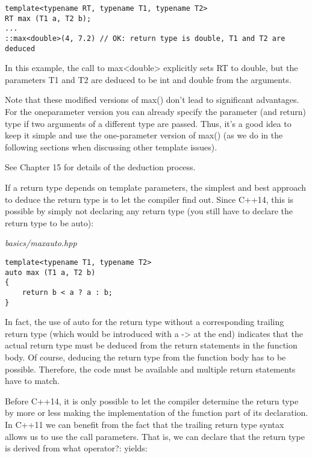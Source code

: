 \begin{lstlisting}[style=styleCXX]
template<typename RT, typename T1, typename T2>
RT max (T1 a, T2 b);
...
::max<double>(4, 7.2) // OK: return type is double, T1 and T2 are deduced
\end{lstlisting}

In this example, the call to max<double> explicitly sets RT to double, but the parameters T1 and T2 are deduced to be int and double from the arguments. 

Note that these modified versions of max() don’t lead to significant advantages. For the oneparameter version you can already specify the parameter (and return) type if two arguments of a different type are passed. Thus, it’s a good idea to keep it simple and use the one-parameter version of max() (as we do in the following sections when discussing other template issues).

See Chapter 15 for details of the deduction process.


If a return type depends on template parameters, the simplest and best approach to deduce the return type is to let the compiler find out. Since C++14, this is possible by simply not declaring any return type (you still have to declare the return type to be auto):

\noindent
\textit{basics/maxauto.hpp}
\begin{lstlisting}[style=styleCXX]
template<typename T1, typename T2>
auto max (T1 a, T2 b)
{
	return b < a ? a : b;
}
\end{lstlisting}

In fact, the use of auto for the return type without a corresponding trailing return type (which would be introduced with a -> at the end) indicates that the actual return type must be deduced from the return statements in the function body. Of course, deducing the return type from the function body has to be possible. Therefore, the code must be available and multiple return statements have to match.

Before C++14, it is only possible to let the compiler determine the return type by more or less making the implementation of the function part of its declaration. In C++11 we can benefit from the fact that the trailing return type syntax allows us to use the call parameters. That is, we can declare that the return type is derived from what operator?: yields:

